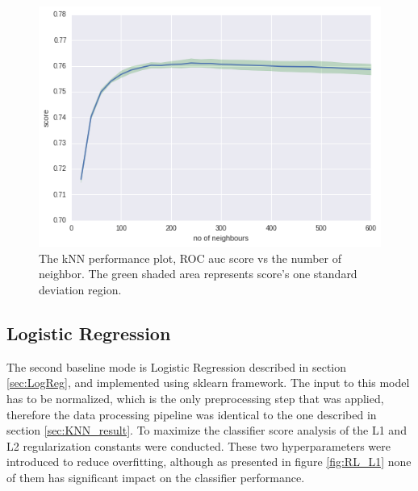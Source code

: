 \begin{figure}[!h]
\centering
\hspace*{-1cm}\includegraphics{figures/knn.png}
\caption{The kNN performance plot, ROC auc score vs the number of neighbor. The green shaded area represents score's one standard deviation region.}
\label{fig:kNN score}
\end{figure}

\subsection{Logistic Regression}

The second baseline mode is Logistic Regression described in section \ref{sec:LogReg}, and implemented using sklearn framework.
The input to this model has to be normalized, which is the only preprocessing step that was applied, therefore the data processing pipeline was identical to the one described in section \ref{sec:KNN_result}. 
To maximize the classifier score analysis of the L1 and L2 regularization constants were conducted. These two hyperparameters were introduced to reduce overfitting, although as presented in figure \ref{fig:RL_L1} none of them has significant impact on the classifier performance.


